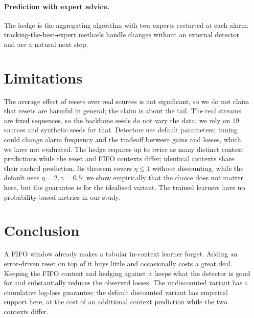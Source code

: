 \documentclass[10pt]{article}
\theoremstyle{definition}
\theoremstyle{remark}
\begin{document}
\paragraph{Prediction with expert advice.} The hedge is the aggregating algorithm with two experts
\citep{vovk1990aggregating,cesabianchi2006prediction} restarted at each alarm; tracking-the-best-expert methods
\citep{herbster1998tracking} handle changes without an external detector and are a natural next step.

\section{Limitations}
\label{sec:limits}

The average effect of resets over real sources is not significant, so we do not claim that resets are harmful in
general; the claim is about the tail. The real streams are fixed sequences, so the backbone seeds do not vary the data;
we rely on 19 sources and synthetic seeds for that. Detectors use default parameters; tuning could change alarm
frequency and the tradeoff between gains and losses, which we have not evaluated. The hedge requires up to twice
as many distinct context predictions while the reset and FIFO contexts differ; identical contexts share their
cached prediction.
Its theorem covers $\eta\le1$ without discounting, while the default uses $\eta=2,\gamma=0.5$; we show empirically that
the choice does not matter here, but the guarantee is for the idealised variant. The trained learners have no
probability-based metrics in our study.

\section{Conclusion}

A FIFO window already makes a tabular in-context learner forget. Adding an error-driven reset on top of it buys little
and occasionally costs a great deal. Keeping the FIFO context and hedging against it keeps what the detector is good
for and substantially reduces the observed losses. The undiscounted variant has a cumulative log-loss guarantee;
the default discounted variant has empirical support here, at the cost of an additional context prediction while
the two contexts differ.



\end{document}
